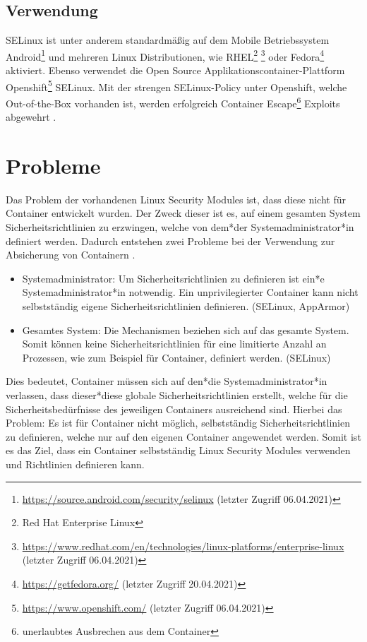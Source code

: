 \subsection{Verwendung}
SELinux ist unter anderem standardmäßig auf dem Mobile Betriebssystem
Android\footnote{\url{https://source.android.com/security/selinux} (letzter
Zugriff 06.04.2021)} und mehreren Linux Distributionen, wie RHEL\footnote{Red
Hat Enterprise Linux}
\footnote{\url{https://www.redhat.com/en/technologies/linux-platforms/enterprise-linux}
(letzter Zugriff 06.04.2021)} oder Fedora\footnote{\url{https://getfedora.org/}
(letzter Zugriff 20.04.2021)} aktiviert. Ebenso verwendet die Open Source
Applikationscontainer-Plattform
Openshift\footnote{\url{https://www.openshift.com/} (letzter Zugriff
06.04.2021)} SELinux. Mit der strengen SELinux-Policy unter Openshift, welche
Out-of-the-Box vorhanden ist, werden erfolgreich Container
Escape\footnote{unerlaubtes Ausbrechen aus dem Container}
Exploits
abgewehrt \cite{openshiftcontainerexploit}.

\section{Probleme}
\label{lab:lsm_probleme}
Das Problem der vorhandenen Linux Security Modules ist, dass diese nicht für
Container entwickelt wurden. Der Zweck dieser ist es, auf einem gesamten System
Sicherheitsrichtlinien zu erzwingen, welche von dem*der Systemadministrator*in definiert
werden. Dadurch entstehen zwei Probleme bei der Verwendung zur Absicherung von
Containern \cite{SecurityNamespace} \cite{Belair}.
\begin{itemize}
  \item Systemadministrator: Um Sicherheitsrichtlinien zu definieren ist ein*e
    System\-administrator*in notwendig. Ein unprivilegierter Container kann nicht
    selbstständig eigene Sicherheitsrichtlinien definieren. (SELinux, AppArmor)
  \item Gesamtes System: Die Mechanismen beziehen sich auf das gesamte System.
    Somit können keine Sicherheitsrichtlinien für eine limitierte Anzahl an
    Prozessen, wie zum Beispiel für Container, definiert werden. (SELinux)
\end{itemize}

Dies bedeutet, Container müssen sich auf den*die Systemadministrator*in verlassen,
dass dieser*diese globale Sicherheitsrichtlinien erstellt, welche für die
Sicherheitsbedürfnisse des jeweiligen Containers ausreichend sind. Hierbei das
Problem: Es ist für Container nicht möglich, selbstständig
Sicherheitsrichtlinien zu definieren, welche nur auf den eigenen Container
angewendet werden. Somit ist es das Ziel, dass ein Container selbstständig
Linux Security Modules verwenden und Richtlinien definieren kann.

